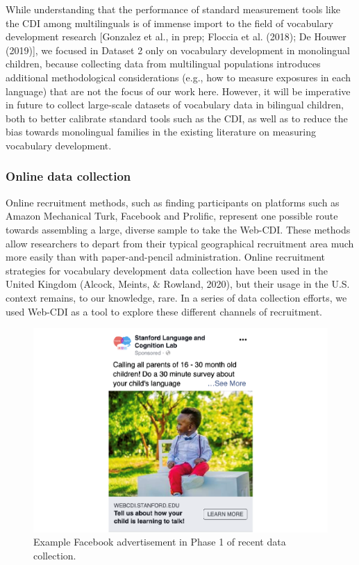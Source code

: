 \documentclass[
  english,
  ,man,floatsintext]{apa6}
\begin{document}
While understanding that the performance of standard measurement tools like the CDI among multilinguals is of immense import to the field of vocabulary development research {[}Gonzalez et al., in prep; Floccia et al. (2018); De Houwer (2019){]}, we focused in Dataset 2 only on vocabulary development in monolingual children, because collecting data from multilingual populations introduces additional methodological considerations (e.g., how to measure exposures in each language) that are not the focus of our work here. However, it will be imperative in future to collect large-scale datasets of vocabulary data in bilingual children, both to better calibrate standard tools such as the CDI, as well as to reduce the bias towards monolingual families in the existing literature on measuring vocabulary development.

\hypertarget{online-data-collection}{%
\subsubsection{Online data collection}\label{online-data-collection}}

Online recruitment methods, such as finding participants on platforms such as Amazon Mechanical Turk, Facebook and Prolific, represent one possible route towards assembling a large, diverse sample to take the Web-CDI. These methods allow researchers to depart from their typical geographical recruitment area much more easily than with paper-and-pencil administration. Online recruitment strategies for vocabulary development data collection have been used in the United Kingdom (Alcock, Meints, \& Rowland, 2020), but their usage in the U.S. context remains, to our knowledge, rare. In a series of data collection efforts, we used Web-CDI as a tool to explore these different channels of recruitment.

\begin{figure}
\centering
\includegraphics{webcdi_paper_files/figure-latex/facebookad-1.pdf}
\caption{\label{fig:facebookad}Example Facebook advertisement in Phase 1 of recent data collection.}
\end{figure}
\end{document}
